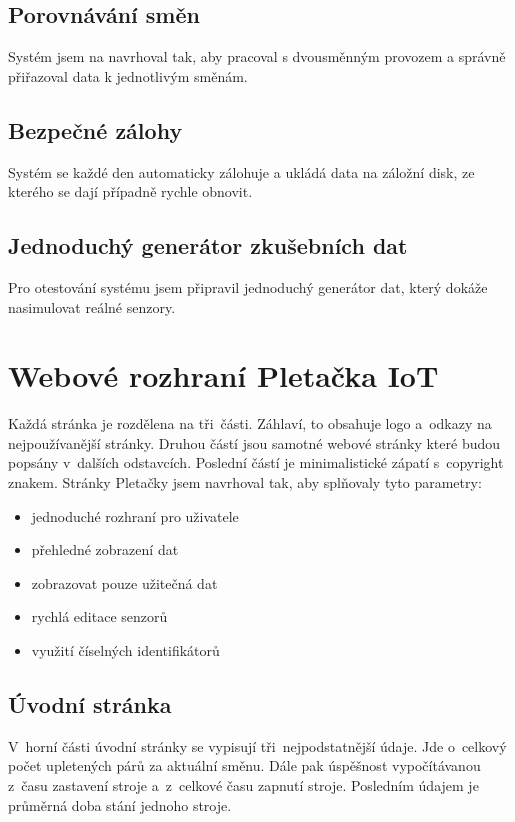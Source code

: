 \subsection{Porovnávání směn}
Systém jsem na navrhoval tak, aby pracoval s dvousměnným provozem a správně přiřazoval data k jednotlivým směnám.


\subsection{Bezpečné zálohy}
Systém se každé den automaticky zálohuje a ukládá data na záložní disk, ze kterého se dají případně rychle obnovit.


\subsection{Jednoduchý generátor zkušebních dat}
Pro otestování systému jsem připravil jednoduchý generátor dat, který dokáže nasimulovat reálné senzory.



\section{Webové rozhraní Pletačka IoT}
Každá stránka je rozdělena na tři~části. Záhlaví, to obsahuje logo a~odkazy na nejpoužívanější stránky.
Druhou částí jsou samotné webové stránky které budou popsány v~dalších odstavcích.
Poslední částí je minimalistické zápatí s~copyright znakem.\newline
Stránky Pletačky jsem navrhoval tak, aby splňovaly tyto parametry:

\begin{itemize}
    \item jednoduché rozhraní pro uživatele
    \item přehledné zobrazení dat
    \item zobrazovat pouze užitečná dat
    \item rychlá editace senzorů
    \item využití číselných identifikátorů
\end{itemize}


\subsection{Úvodní stránka}
V~horní části úvodní stránky se vypisují tři~nejpodstatnější údaje.
Jde o~celkový počet upletených párů za aktuální směnu.
Dále pak úspěšnost vypočítávanou z~času zastavení stroje a~z~celkové času zapnutí stroje.
Posledním údajem je průměrná doba stání jednoho stroje.   

